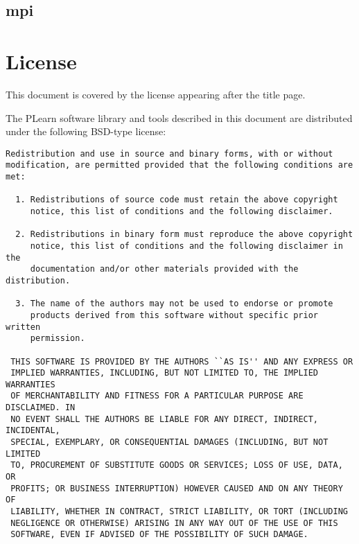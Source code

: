 \documentclass[11pt]{book}
\begin{document}
\section{mpi}


\chapter*{License}

This document is covered by the license appearing after the title page.

\vspace*{.5cm}

The PLearn software library and tools described in this document are
distributed under the following BSD-type license:

\begin{verbatim}
Redistribution and use in source and binary forms, with or without
modification, are permitted provided that the following conditions are met:
 
  1. Redistributions of source code must retain the above copyright
     notice, this list of conditions and the following disclaimer.
 
  2. Redistributions in binary form must reproduce the above copyright
     notice, this list of conditions and the following disclaimer in the
     documentation and/or other materials provided with the distribution.
 
  3. The name of the authors may not be used to endorse or promote
     products derived from this software without specific prior written
     permission.
 
 THIS SOFTWARE IS PROVIDED BY THE AUTHORS ``AS IS'' AND ANY EXPRESS OR
 IMPLIED WARRANTIES, INCLUDING, BUT NOT LIMITED TO, THE IMPLIED WARRANTIES
 OF MERCHANTABILITY AND FITNESS FOR A PARTICULAR PURPOSE ARE DISCLAIMED. IN
 NO EVENT SHALL THE AUTHORS BE LIABLE FOR ANY DIRECT, INDIRECT, INCIDENTAL,
 SPECIAL, EXEMPLARY, OR CONSEQUENTIAL DAMAGES (INCLUDING, BUT NOT LIMITED
 TO, PROCUREMENT OF SUBSTITUTE GOODS OR SERVICES; LOSS OF USE, DATA, OR
 PROFITS; OR BUSINESS INTERRUPTION) HOWEVER CAUSED AND ON ANY THEORY OF
 LIABILITY, WHETHER IN CONTRACT, STRICT LIABILITY, OR TORT (INCLUDING
 NEGLIGENCE OR OTHERWISE) ARISING IN ANY WAY OUT OF THE USE OF THIS
 SOFTWARE, EVEN IF ADVISED OF THE POSSIBILITY OF SUCH DAMAGE.

\end{verbatim}
\end{document}
